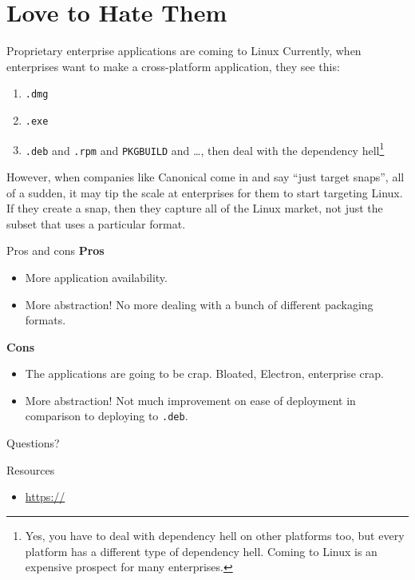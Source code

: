 \documentclass{lug}
\begin{document}
\section{Love to Hate Them}

\begin{frame}{Proprietary enterprise applications are coming to Linux}
    Currently, when enterprises want to make a cross-platform application, they
    see this:
    \begin{enumerate}[leftmargin=2cm]
        \item[macOS] \texttt{.dmg}
        \item[Windows] \texttt{.exe}
        \item[Linux] \texttt{.deb} and \texttt{.rpm} and \texttt{PKGBUILD} and
            \dots, then deal with the dependency hell\footnote[frame]{Yes, you
            have to deal with dependency hell on other platforms too, but every
            platform has a different type of dependency hell. Coming to Linux is
            an expensive prospect for many enterprises.}
    \end{enumerate}

    However, when companies like Canonical come in and say ``just target
    snaps'', all of a sudden, it may tip the scale at enterprises for them to
    start targeting Linux. If they create a snap, then they capture all of the
    Linux market, not just the subset that uses a particular format.
\end{frame}

\begin{frame}{Pros and cons}
    \textbf{Pros}
    \begin{itemize}
        \item More application availability.
        \item More abstraction! No more dealing with a bunch of different
            packaging formats.
    \end{itemize}

    \textbf{Cons}
    \begin{itemize}
        \item The applications are going to be crap. Bloated, Electron,
            enterprise crap.
        \item More abstraction! Not much improvement on ease of deployment in
            comparison to deploying to \texttt{.deb}.
    \end{itemize}
\end{frame}


\begin{frame}[standout]
    \Huge
    Questions?
\end{frame}

\begin{frame}{Resources}
    \begin{itemize}
        \item \url{https://}
    \end{itemize}
\end{frame}
\end{document}
